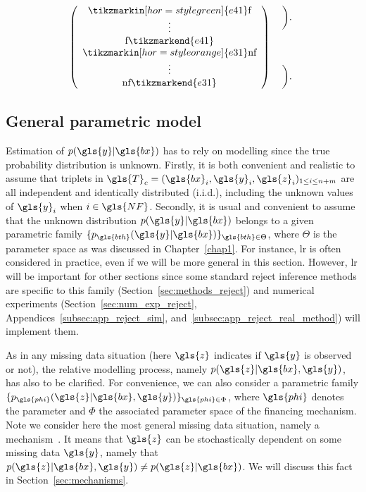 \[\left( \begin{array}{c}
\tikzmarkin[hor=style green]{e41} \text{f} \\
\vdots \\
\text{f} \tikzmarkend{e41} \\ 
\tikzmarkin[hor=style orange]{e31} \text{nf} \\
\vdots \\
\text{nf} \tikzmarkend{e31} \end{array} \right)
 \hspace{0.2cm}
 \begin{array}{c}
\bigg). \\
\\
\\
\\
\bigg). \end{array}
\]


\subsection{General parametric model}

Estimation of $p(\gls{y}|\gls{bx})$ has to rely on modelling since the true probability distribution is unknown. Firstly, it is both convenient and realistic to assume that triplets in $\gls{T}_c = (\gls{bx}_i,\gls{y}_i,\gls{z}_i)_{1\le i\le n+m}$ are all independent and identically distributed (i.i.d.), including the unknown values of $\gls{y}_i$ when $i\in \gls{NF}$. Secondly, it is usual and convenient to assume that the unknown distribution $p(\gls{y}|\gls{bx})$ belongs to a given parametric family $\{p_{\gls{bth}}(\gls{y}|\gls{bx})\}_{\gls{bth} \in\Theta}$, where $\Theta$ is the parameter space as was discussed in Chapter~\ref{chap1}. For instance, \gls{lr} is often considered in practice, even if we will be more general in this section. However, \gls{lr} will be important for other sections since some standard reject inference methods are specific to this family (Section~\ref{sec:methods_reject}) and numerical experiments (Section~\ref{sec:num_exp_reject}, Appendices~\ref{subsec:app_reject_sim}, and~\ref{subsec:app_reject_real_method}) will implement them.

As in any missing data situation (here $\gls{z}$ indicates if $\gls{y}$ is observed or not), the relative modelling process, namely $p(\gls{z}|\gls{bx},\gls{y})$, has also to be clarified. For convenience, we can also consider a parametric family $\{p_{\gls{phi}}(\gls{z}|\gls{bx},\gls{y})\}_{\gls{phi} \in \Phi}$, where $\gls{phi}$ denotes the parameter and $\Phi$ the associated parameter space of the financing mechanism. Note we consider here the most general missing data situation, namely a  mechanism~\cite{littlerubin}. It means that $\gls{z}$ can be stochastically dependent on some missing data $\gls{y}$, namely that $p(\gls{z}|\gls{bx},\gls{y})\neq p(\gls{z}|\gls{bx})$. We will discuss this fact in Section~\ref{sec:mechanisms}.

